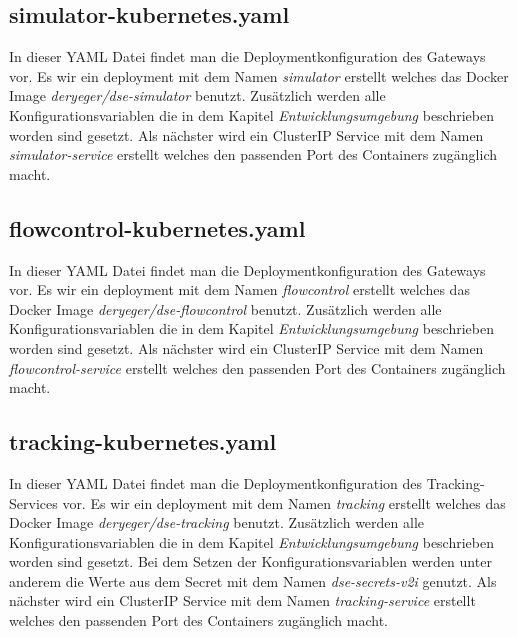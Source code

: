 \subsection{simulator-kubernetes.yaml}

In dieser YAML Datei findet man die Deploymentkonfiguration des Gateways vor. Es wir ein deployment mit dem Namen \textit{simulator} erstellt welches das Docker Image \textit{deryeger/dse-simulator} benutzt. Zusätzlich werden alle Konfigurationsvariablen die in dem Kapitel \textit{Entwicklungsumgebung} beschrieben worden sind gesetzt. 
Als nächster wird ein ClusterIP Service mit dem Namen \textit{simulator-service} erstellt welches den passenden Port des Containers zugänglich macht.

\subsection{flowcontrol-kubernetes.yaml}

In dieser YAML Datei findet man die Deploymentkonfiguration des Gateways vor. Es wir ein deployment mit dem Namen \textit{flowcontrol} erstellt welches das Docker Image \textit{deryeger/dse-flowcontrol} benutzt. Zusätzlich werden alle Konfigurationsvariablen die in dem Kapitel \textit{Entwicklungsumgebung} beschrieben worden sind gesetzt. 
Als nächster wird ein ClusterIP Service mit dem Namen \textit{flowcontrol-service} erstellt welches den passenden Port des Containers zugänglich macht.

\subsection{tracking-kubernetes.yaml}

In dieser YAML Datei findet man die Deploymentkonfiguration des Tracking-Services vor. Es wir ein deployment mit dem Namen \textit{tracking} erstellt welches das Docker Image \textit{deryeger/dse-tracking} benutzt. Zusätzlich werden alle Konfigurationsvariablen die in dem Kapitel \textit{Entwicklungsumgebung} beschrieben worden sind gesetzt. Bei dem Setzen der Konfigurationsvariablen werden unter anderem die Werte aus dem Secret mit dem Namen  \textit{dse-secrets-v2i} genutzt.
Als nächster wird ein ClusterIP Service mit dem Namen \textit{tracking-service} erstellt welches den passenden Port des Containers zugänglich macht.
